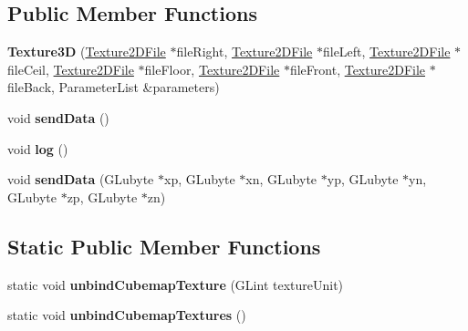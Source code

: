 \subsection*{Public Member Functions}
\begin{DoxyCompactItemize}
\item 
{\bfseries Texture3D} (\hyperlink{classflw_1_1flc_1_1Texture2DFile}{Texture2\+D\+File} $\ast$file\+Right, \hyperlink{classflw_1_1flc_1_1Texture2DFile}{Texture2\+D\+File} $\ast$file\+Left, \hyperlink{classflw_1_1flc_1_1Texture2DFile}{Texture2\+D\+File} $\ast$file\+Ceil, \hyperlink{classflw_1_1flc_1_1Texture2DFile}{Texture2\+D\+File} $\ast$file\+Floor, \hyperlink{classflw_1_1flc_1_1Texture2DFile}{Texture2\+D\+File} $\ast$file\+Front, \hyperlink{classflw_1_1flc_1_1Texture2DFile}{Texture2\+D\+File} $\ast$file\+Back, Parameter\+List \&parameters)\hypertarget{classflw_1_1flc_1_1Texture3D_a68f42a7e4c56246c847195abad77ab34}{}\label{classflw_1_1flc_1_1Texture3D_a68f42a7e4c56246c847195abad77ab34}

\item 
void {\bfseries send\+Data} ()\hypertarget{classflw_1_1flc_1_1Texture3D_afe8447e862c1728ad34f391a402bb817}{}\label{classflw_1_1flc_1_1Texture3D_afe8447e862c1728ad34f391a402bb817}

\item 
void {\bfseries log} ()\hypertarget{classflw_1_1flc_1_1Texture3D_a74602d5af93c7838c4e9b11c97d59be0}{}\label{classflw_1_1flc_1_1Texture3D_a74602d5af93c7838c4e9b11c97d59be0}

\item 
void {\bfseries send\+Data} (G\+Lubyte $\ast$xp, G\+Lubyte $\ast$xn, G\+Lubyte $\ast$yp, G\+Lubyte $\ast$yn, G\+Lubyte $\ast$zp, G\+Lubyte $\ast$zn)\hypertarget{classflw_1_1flc_1_1Texture3D_a61ec70316db57594683de3298d30bdc3}{}\label{classflw_1_1flc_1_1Texture3D_a61ec70316db57594683de3298d30bdc3}

\end{DoxyCompactItemize}
\subsection*{Static Public Member Functions}
\begin{DoxyCompactItemize}
\item 
static void {\bfseries unbind\+Cubemap\+Texture} (G\+Lint texture\+Unit)\hypertarget{classflw_1_1flc_1_1Texture3D_ad7ee6ee6a3543a20228e8b88483409dd}{}\label{classflw_1_1flc_1_1Texture3D_ad7ee6ee6a3543a20228e8b88483409dd}

\item 
static void {\bfseries unbind\+Cubemap\+Textures} ()\hypertarget{classflw_1_1flc_1_1Texture3D_ad90f22fc387bf9d2724096b34571dc25}{}\label{classflw_1_1flc_1_1Texture3D_ad90f22fc387bf9d2724096b34571dc25}

\end{DoxyCompactItemize}
